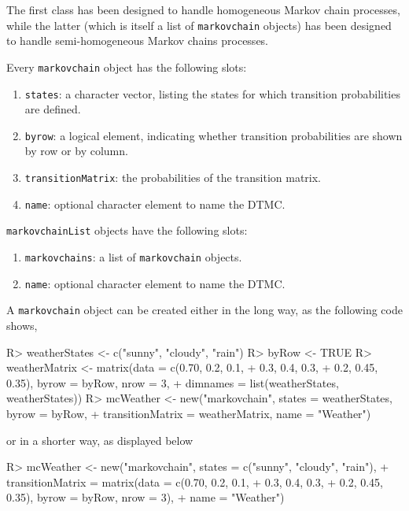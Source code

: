 \documentclass[
  nojss]{jss}
\providecommand{\tightlist}{%
  \setlength{\itemsep}{0pt}\setlength{\parskip}{0pt}}
\begin{document}
The first class has been designed to handle homogeneous Markov chain processes, while the latter (which is itself a list of \texttt{markovchain} objects) has been designed to handle semi-homogeneous Markov chains processes.

Every \texttt{markovchain} object has the following slots:

\begin{enumerate}
\def\labelenumi{\arabic{enumi}.}
\tightlist
\item
  \texttt{states}: a character vector, listing the states for which transition probabilities are defined.
\item
  \texttt{byrow}: a logical element, indicating whether transition probabilities are shown by row or by column.
\item
  \texttt{transitionMatrix}: the probabilities of the transition matrix.
\item
  \texttt{name}: optional character element to name the DTMC.
\end{enumerate}

\texttt{markovchainList} objects have the following slots:

\begin{enumerate}
\def\labelenumi{\arabic{enumi}.}
\tightlist
\item
  \texttt{markovchains}: a list of \texttt{markovchain} objects.
\item
  \texttt{name}: optional character element to name the DTMC.
\end{enumerate}

A \texttt{markovchain} object can be created either in the long way, as the following code shows,

\begin{CodeChunk}
\begin{CodeInput}
R> weatherStates <- c("sunny", "cloudy", "rain")
R> byRow <- TRUE
R> weatherMatrix <- matrix(data = c(0.70, 0.2, 0.1,
+                        0.3, 0.4, 0.3,
+                        0.2, 0.45, 0.35), byrow = byRow, nrow = 3,
+                      dimnames = list(weatherStates, weatherStates))
R> mcWeather <- new("markovchain", states = weatherStates, byrow = byRow, 
+                transitionMatrix = weatherMatrix, name = "Weather")
\end{CodeInput}
\end{CodeChunk}

or in a shorter way, as displayed below

\begin{CodeChunk}
\begin{CodeInput}
R> mcWeather <- new("markovchain", states = c("sunny", "cloudy", "rain"),
+                  transitionMatrix = matrix(data = c(0.70, 0.2, 0.1,
+                        0.3, 0.4, 0.3,
+                        0.2, 0.45, 0.35), byrow = byRow, nrow = 3), 
+                  name = "Weather")
\end{CodeInput}
\end{CodeChunk}
\end{document}
